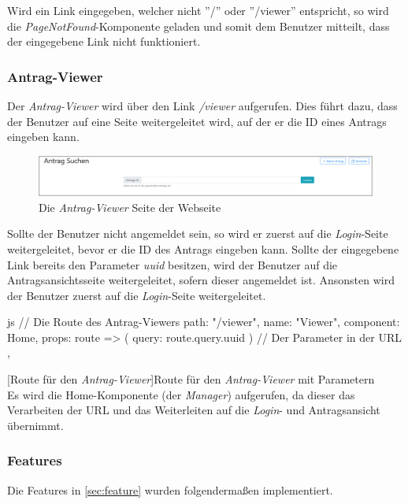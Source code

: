 Wird ein Link eingegeben, welcher nicht ''/'' oder ''/viewer'' entspricht, so wird die \textit{PageNotFound}-Komponente geladen und somit dem Benutzer mitteilt, dass der eingegebene Link nicht funktioniert.
\subsubsection{Antrag-Viewer}
\label{sec:antrag_viewer}
Der \textit{Antrag-Viewer} wird über den Link \textit{/viewer} aufgerufen. Dies führt dazu, dass der Benutzer auf eine Seite weitergeleitet wird, auf der er die ID eines Antrags eingeben kann.
\begin{figure}[H]
	\centering
	\includegraphics[width=1\linewidth]{images/rfoster_implementierung/antrag_viewer}
	\caption[Webseite \textit{Antrag-Viewer}]{Die \textit{Antrag-Viewer} Seite der Webseite}
	\label{fig:antragviewer}
\end{figure}

Sollte der Benutzer nicht angemeldet sein, so wird er zuerst auf die \textit{Login}-Seite weitergeleitet, bevor er die ID des Antrags eingeben kann. Sollte der eingegebene Link bereits den Parameter \textit{uuid} besitzen, wird der Benutzer auf die Antragsansichtsseite weitergeleitet, sofern dieser angemeldet ist. Ansonsten wird der Benutzer zuerst auf die \textit{Login}-Seite weitergeleitet.
\begin{code}{js}
	{
		// Die Route des Antrag-Viewers
		path: "/viewer",
		name: "Viewer",
		component: Home,
		props: route => ({ query: route.query.uuid }) // Der Parameter in der URL
	},
\end{code}
[Route für den \textit{Antrag-Viewer}]{Route für den \textit{Antrag-Viewer} mit Parametern}~\\
Es wird die Home-Komponente (der \textit{Manager}) aufgerufen, da dieser das Verarbeiten der URL und das Weiterleiten auf die \textit{Login}- und Antragsansicht übernimmt.
\newpage
\subsubsection{Features}
Die Features in \autoref{sec:feature} wurden folgendermaßen implementiert.


